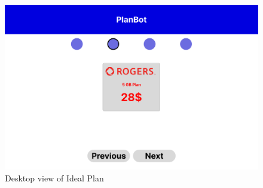\documentclass[conference]{IEEEtran}
\begin{document}
\begin{figure}[H]
    \centering
    \includegraphics[width=1\linewidth]{Desktop/The Ideal Plan - DesktopDESKTOP.png}
    \caption{Desktop view of Ideal Plan}
    \label{fig:user flow}
\end{figure}
\end{document}
